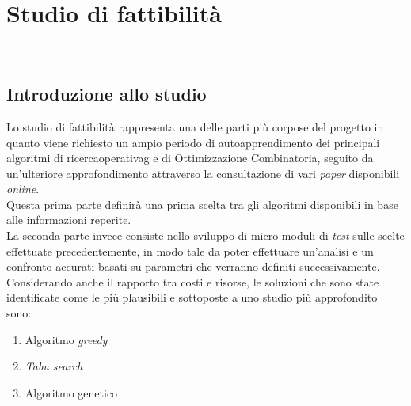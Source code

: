 
\chapter{Studio di fattibilità}
\label{cap:studio-fattibilita}

\noindent {}\\

\section{Introduzione allo studio}
\noindent Lo studio di fattibilità rappresenta una delle parti più corpose
del progetto in quanto viene richiesto un ampio periodo di autoapprendimento
dei principali algoritmi di \gls{ricercaoperativag} e di Ottimizzazione Combinatoria,
seguito da un'ulteriore approfondimento attraverso la consultazione di vari \textit{paper}
disponibili \textit{online}.\\

\noindent Questa prima parte definirà una prima scelta tra gli algoritmi disponibili in base alle informazioni reperite.\\

\noindent La seconda parte invece consiste nello sviluppo di micro-moduli di \textit{test} sulle scelte effettuate
precedentemente, in modo tale da poter effettuare un'analisi e un confronto accurati basati su parametri che verranno
definiti successivamente.\\

\noindent Considerando anche il rapporto tra costi e risorse, le soluzioni che sono state identificate come le più plausibili e sottoposte a uno studio più approfondito sono:
\begin{enumerate}
    \item Algoritmo \textit{greedy}
    \item \textit{Tabu search}
    \item Algoritmo genetico
\end{enumerate}


